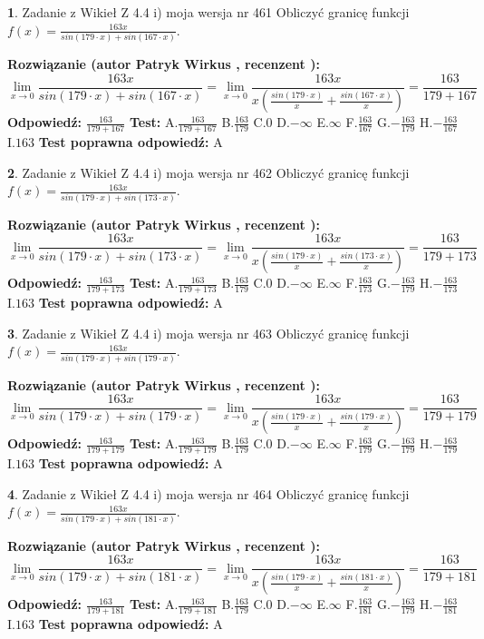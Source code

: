 \documentclass[12pt, a4paper]{article}
\theoremstyle{definition} %
\newtheorem{zad}{}
\newcommand{\zadStart}[1]{\begin{zad}#1\newline}
\newcommand{\zadStop}{\end{zad}}
\newcommand{\rozwStart}[2]{\noindent \textbf{Rozwiązanie (autor #1 , recenzent #2): }\newline}
\newcommand{\rozwStop}{\newline}
\newcommand{\odpStart}{\noindent \textbf{Odpowiedź:}\newline}
\newcommand{\odpStop}{\newline}
\newcommand{\testStart}{\noindent \textbf{Test:}\newline}
\newcommand{\testStop}{\newline}
\newcommand{\kluczStart}{\noindent \textbf{Test poprawna odpowiedź:}\newline}
\newcommand{\kluczStop}{\newline}
\begin{document}
\zadStart{Zadanie z Wikieł Z 4.4 i) moja wersja nr 461}
Obliczyć granicę funkcji $f(x)=\frac{163x}{sin(179\cdot x) +sin(167\cdot x)}$.
\zadStop
\rozwStart{Patryk Wirkus}{}
$$\lim\limits_{x\to 0}\frac{163x}{sin(179\cdot x) +sin(167\cdot x)}=\lim\limits_{x\to 0}\frac{163x}{x(\frac{sin(179\cdot x)}{x}+\frac{sin(167\cdot x)}{x})}=\frac{163}{179+167}$$
\rozwStop
\odpStart
$\frac{163}{179+167}$
\odpStop
\testStart
A.$\frac{163}{179+167}$
B.$\frac{163}{179}$
C.$0$
D.$-\infty$
E.$\infty$
F.$\frac{163}{167}$
G.$-\frac{163}{179}$
H.$-\frac{163}{167}$
I.$163$
\testStop
\kluczStart
A
\kluczStop



\zadStart{Zadanie z Wikieł Z 4.4 i) moja wersja nr 462}
Obliczyć granicę funkcji $f(x)=\frac{163x}{sin(179\cdot x) +sin(173\cdot x)}$.
\zadStop
\rozwStart{Patryk Wirkus}{}
$$\lim\limits_{x\to 0}\frac{163x}{sin(179\cdot x) +sin(173\cdot x)}=\lim\limits_{x\to 0}\frac{163x}{x(\frac{sin(179\cdot x)}{x}+\frac{sin(173\cdot x)}{x})}=\frac{163}{179+173}$$
\rozwStop
\odpStart
$\frac{163}{179+173}$
\odpStop
\testStart
A.$\frac{163}{179+173}$
B.$\frac{163}{179}$
C.$0$
D.$-\infty$
E.$\infty$
F.$\frac{163}{173}$
G.$-\frac{163}{179}$
H.$-\frac{163}{173}$
I.$163$
\testStop
\kluczStart
A
\kluczStop



\zadStart{Zadanie z Wikieł Z 4.4 i) moja wersja nr 463}
Obliczyć granicę funkcji $f(x)=\frac{163x}{sin(179\cdot x) +sin(179\cdot x)}$.
\zadStop
\rozwStart{Patryk Wirkus}{}
$$\lim\limits_{x\to 0}\frac{163x}{sin(179\cdot x) +sin(179\cdot x)}=\lim\limits_{x\to 0}\frac{163x}{x(\frac{sin(179\cdot x)}{x}+\frac{sin(179\cdot x)}{x})}=\frac{163}{179+179}$$
\rozwStop
\odpStart
$\frac{163}{179+179}$
\odpStop
\testStart
A.$\frac{163}{179+179}$
B.$\frac{163}{179}$
C.$0$
D.$-\infty$
E.$\infty$
F.$\frac{163}{179}$
G.$-\frac{163}{179}$
H.$-\frac{163}{179}$
I.$163$
\testStop
\kluczStart
A
\kluczStop



\zadStart{Zadanie z Wikieł Z 4.4 i) moja wersja nr 464}
Obliczyć granicę funkcji $f(x)=\frac{163x}{sin(179\cdot x) +sin(181\cdot x)}$.
\zadStop
\rozwStart{Patryk Wirkus}{}
$$\lim\limits_{x\to 0}\frac{163x}{sin(179\cdot x) +sin(181\cdot x)}=\lim\limits_{x\to 0}\frac{163x}{x(\frac{sin(179\cdot x)}{x}+\frac{sin(181\cdot x)}{x})}=\frac{163}{179+181}$$
\rozwStop
\odpStart
$\frac{163}{179+181}$
\odpStop
\testStart
A.$\frac{163}{179+181}$
B.$\frac{163}{179}$
C.$0$
D.$-\infty$
E.$\infty$
F.$\frac{163}{181}$
G.$-\frac{163}{179}$
H.$-\frac{163}{181}$
I.$163$
\testStop
\kluczStart
A
\kluczStop
\end{document}
